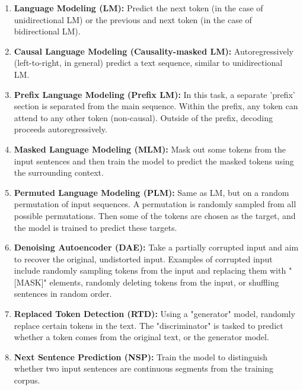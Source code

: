 \documentclass{article}
\begin{document}
\begin{enumerate}
    \item \textbf{Language Modeling (LM):} Predict the next token (in the case of unidirectional LM) or the previous and next token (in the case of bidirectional LM).
    \item \textbf{Causal Language Modeling (Causality-masked LM):} Autoregressively (left-to-right, in general) predict a text sequence, similar to unidirectional LM.
    \item \textbf{Prefix Language Modeling (Prefix LM):} In this task, a separate 'prefix' section is separated from the main sequence. Within the prefix, any token can attend to any other token (non-causal). Outside of the prefix, decoding proceeds autoregressively.
    \item \textbf{Masked Language Modeling (MLM):} Mask out some tokens from the input sentences and then train the model to predict the masked tokens using the surrounding context.
    \item \textbf{Permuted Language Modeling (PLM):} Same as LM, but on a random permutation of input sequences. A permutation is randomly sampled from all possible permutations. Then some of the tokens are chosen as the target, and the model is trained to predict these targets.
    \item \textbf{Denoising Autoencoder (DAE):} Take a partially corrupted input and aim to recover the original, undistorted input. Examples of corrupted input include randomly sampling tokens from the input and replacing them with "[MASK]" elements, randomly deleting tokens from the input, or shuffling sentences in random order.
       
       \item \textbf{Replaced Token Detection (RTD):} Using a "generator" model, randomly replace certain tokens in the text. The "discriminator" is tasked to predict whether a token comes from the original text, or the generator model.
       \item \textbf{Next Sentence Prediction (NSP):} Train the model to distinguish whether two input sentences are continuous segments from the training corpus.
       
   
\end{enumerate}
\end{document}
